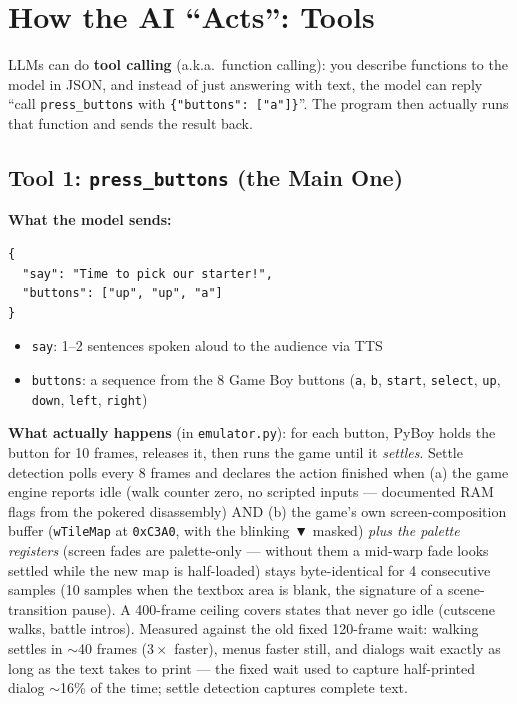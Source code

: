 \documentclass[11pt]{article}
\newcommand{\code}[1]{\texttt{#1}}
\begin{document}
\section{How the AI ``Acts'': Tools}

LLMs can do \textbf{tool calling} (a.k.a.\ function calling): you describe functions to the model in JSON, and instead of just answering with text, the model can reply ``call \code{press\_buttons} with \code{\{"buttons": ["a"]\}}''. The program then actually runs that function and sends the result back.

\subsection{Tool 1: \code{press\_buttons} (the Main One)}

\textbf{What the model sends:}
\begin{verbatim}
{
  "say": "Time to pick our starter!",
  "buttons": ["up", "up", "a"]
}
\end{verbatim}

\begin{itemize}[nosep]
  \item \code{say}: 1--2 sentences spoken aloud to the audience via TTS
  \item \code{buttons}: a sequence from the 8 Game Boy buttons (\code{a}, \code{b}, \code{start}, \code{select}, \code{up}, \code{down}, \code{left}, \code{right})
\end{itemize}

\textbf{What actually happens} (in \code{emulator.py}): for each button, PyBoy holds the button for 10 frames, releases it, then runs the game until it \emph{settles}. Settle detection polls every 8 frames and declares the action finished when (a) the game engine reports idle (walk counter zero, no scripted inputs --- documented RAM flags from the pokered disassembly) AND (b) the game's own screen-composition buffer (\code{wTileMap} at \code{0xC3A0}, with the blinking ▼ masked) \emph{plus the palette registers} (screen fades are palette-only --- without them a mid-warp fade looks settled while the new map is half-loaded) stays byte-identical for 4 consecutive samples (10 samples when the textbox area is blank, the signature of a scene-transition pause). A 400-frame ceiling covers states that never go idle (cutscene walks, battle intros). Measured against the old fixed 120-frame wait: walking settles in $\sim$40 frames ($3\times$ faster), menus faster still, and dialogs wait exactly as long as the text takes to print --- the fixed wait used to capture half-printed dialog $\sim$16\% of the time; settle detection captures complete text.
\end{document}
